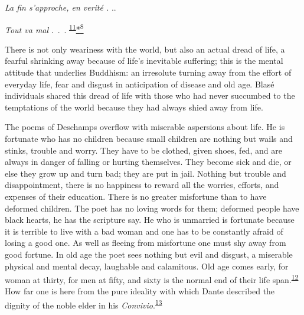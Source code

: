\emph{La fin s'approche, en verité .} ..

\emph{Tout va mal} .~.~.
\textsuperscript{\protect\hypertarget{09_Chapter_Two__THE_CRAVING_FOR_A_M.xhtmlux5cux23id_2064}{\protect\hyperlink{23_NOTES.xhtmlux5cux23id_2065}{11}}}\protect\hypertarget{09_Chapter_Two__THE_CRAVING_FOR_A_M.xhtmlux5cux23id_2425}{\protect\hyperlink{23_NOTES.xhtmlux5cux23id_2426}{*\textsuperscript{8}}}

There is not only weariness with the world, but also an actual dread of
life, a fearful shrinking away because of life's inevitable suffering;
this is the mental attitude that underlies Buddhism: an irresolute
turning away from the effort of everyday life, fear and disgust in
anticipation of disease and old age. Blasé individuals shared this dread
of life with those who had never succumbed to the temptations of the
world because they had always shied away from life.

The poems of Deschamps overflow with miserable aspersions about life. He
is fortunate who has no children because small children are nothing but
wails and stinks, trouble and worry. They have to be clothed, given
shoes, fed, and are always in danger of falling or hurting themselves.
They become sick and die, or else they grow up and turn bad; they are
put in jail. Nothing but trouble and disappointment, there is no
happiness to reward all the worries, efforts, and expenses of their
education. There is no greater misfortune than to have deformed
children. The poet has no loving words for them; deformed people have
black hearts, he has the scripture say. He who is unmarried is fortunate
because it is terrible to live with a bad woman and one has to be
constantly afraid of losing a
\protect\hypertarget{09_Chapter_Two__THE_CRAVING_FOR_A_M.xhtmlux5cux23page_36}{}{}good
one. As well as fleeing from misfortune one must shy away from good
fortune. In old age the poet sees nothing but evil and disgust, a
miserable physical and mental decay, laughable and calamitous. Old age
comes early, for woman at thirty, for men at fifty, and sixty is the
normal end of their life
span.\textsuperscript{\protect\hypertarget{09_Chapter_Two__THE_CRAVING_FOR_A_M.xhtmlux5cux23id_2062}{\protect\hyperlink{23_NOTES.xhtmlux5cux23id_2063}{12}}}
How far one is here from the pure ideality with which Dante described
the dignity of the noble elder in his
\emph{Convivio}.\textsuperscript{\protect\hypertarget{09_Chapter_Two__THE_CRAVING_FOR_A_M.xhtmlux5cux23id_2060}{\protect\hyperlink{23_NOTES.xhtmlux5cux23id_2061}{13}}}

